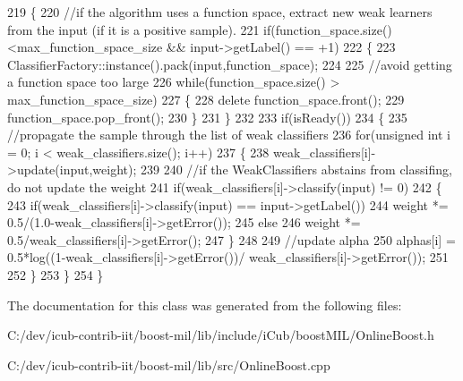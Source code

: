 \begin{DoxyCode}
219 \{
220     \textcolor{comment}{//if the algorithm uses a function space, extract new weak learners from the input (if it is a positive
       sample).}
221     \textcolor{keywordflow}{if}(function_space.size()<max\_function\_space\_size && input->getLabel() == +1)
222     \{
223         ClassifierFactory::instance().pack(input,function_space);
224 
225         \textcolor{comment}{//avoid getting a function space too large}
226         \textcolor{keywordflow}{while}(function_space.size() > max\_function\_space\_size)
227         \{
228             \textcolor{keyword}{delete} function_space.front();
229             function_space.pop\_front();
230         \}
231     \}
232 
233     \textcolor{keywordflow}{if}(isReady())
234     \{
235         \textcolor{comment}{//propagate the sample through the list of weak classifiers}
236         \textcolor{keywordflow}{for}(\textcolor{keywordtype}{unsigned} \textcolor{keywordtype}{int} i = 0; i < weak_classifiers.size(); i++)
237         \{
238             weak_classifiers[i]->update(input,weight);
239 
240             \textcolor{comment}{//if the WeakClassifiers abstains from classifing, do not update the weight}
241             \textcolor{keywordflow}{if}(weak_classifiers[i]->classify(input) != 0)
242             \{
243                 \textcolor{keywordflow}{if}(weak_classifiers[i]->classify(input) == input->getLabel())
244                     weight *= 0.5/(1.0-weak_classifiers[i]->getError());
245                 \textcolor{keywordflow}{else}
246                     weight *= 0.5/weak_classifiers[i]->getError();
247             \}
248 
249             \textcolor{comment}{//update alpha}
250             alphas[i] = 0.5*log((1-weak_classifiers[i]->getError())/
      weak_classifiers[i]->getError());
251 
252         \}
253     \}
254 \}
\end{DoxyCode}


The documentation for this class was generated from the following files\+:\begin{DoxyCompactItemize}
\item 
C\+:/dev/icub-\/contrib-\/iit/boost-\/mil/lib/include/i\+Cub/boost\+M\+I\+L/Online\+Boost.\+h\item 
C\+:/dev/icub-\/contrib-\/iit/boost-\/mil/lib/src/Online\+Boost.\+cpp\end{DoxyCompactItemize}
